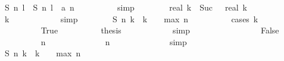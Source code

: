 \begin{isabellebody}
\ {\isachardoublequoteopen}{\isacharquery}S\ n\ l\ {\isacharequal}\ {\isacharquery}S\ {\isacharparenleft}n{\isacharminus}{}{\isacharparenright}\ {\isacharparenleft}l{\isacharminus}{}{\isacharparenright}\ {\isacharplus}\ a\ {\isacharparenleft}n{\isacharminus}{}{\isacharparenright}{\isachardoublequoteclose}\isanewline
\ \ \ \ \ \ \ \ \isamarkupfalse%
\ simp\isanewline
\isanewline
\ \ \ \ \ \ \isamarkupfalse%
\ {\isachardoublequoteopen}real\ {\isacharparenleft}k\ {\isacharminus}\ Suc\ {}{\isacharparenright}\ {\isacharequal}\ real\ k\ {\isacharminus}\ {}{\isachardoublequoteclose}\isanewline
\ \ \ \ \ \ \ \ \isamarkupfalse%
\ {\isacharbackquoteopen}k\ {\isasymge}\ {}{\isacharbackquoteclose}\isanewline
\ \ \ \ \ \ \ \ \isamarkupfalse%
\ simp\isanewline
\isanewline
\ \ \ \ \ \ \isamarkupfalse%
\ {\isachardoublequoteopen}{\isacharquery}S\ {\isacharparenleft}n{\isacharminus}{}{\isacharparenright}\ {\isacharparenleft}k{\isacharminus}{}{\isacharparenright}\ {\isasymle}\ {\isacharparenleft}k\ {\isacharminus}\ {}{\isacharparenright}\ {\isacharasterisk}\ {\isacharquery}max\ {\isacharparenleft}n\ {\isacharminus}\ {}{\isacharparenright}{\isachardoublequoteclose}\isanewline
\ \ \ \ \ \ \isamarkupfalse%
\ {\isacharparenleft}cases\ {\isachardoublequoteopen}k\ {\isacharequal}\ {}{\isachardoublequoteclose}{\isacharparenright}\isanewline
\ \ \ \ \ \ \ \ \isamarkupfalse%
\ True\isanewline
\ \ \ \ \ \ \ \ \isamarkupfalse%
\ {\isacharquery}thesis\isanewline
\ \ \ \ \ \ \ \ \ \ \isamarkupfalse%
\ simp\isanewline
\ \ \ \ \ \ \isamarkupfalse%
\isanewline
\ \ \ \ \ \ \ \ \isamarkupfalse%
\ False\isanewline
\ \ \ \ \ \ \ \ \isamarkupfalse%
\ {\isachardoublequoteopen}n{\isacharminus}{}\ {\isasymge}\ {}{\isachardoublequoteclose}\isanewline
\ \ \ \ \ \ \ \ \ \ \isamarkupfalse%
\ {\isacharbackquoteopen}n\ {\isachargreater}\ {}{\isacharbackquoteclose}\isanewline
\ \ \ \ \ \ \ \ \ \ \isamarkupfalse%
\ simp\isanewline
\ \ \ \ \ \ \ \ \isamarkupfalse%
\ {\isachardoublequoteopen}{\isacharquery}S\ {\isacharparenleft}n{\isacharminus}{}{\isacharparenright}\ {\isacharparenleft}k{\isacharminus}{}{\isacharparenright}\ {\isacharslash}\ {\isacharparenleft}k\ {\isacharminus}\ {}{\isacharparenright}\ {\isasymle}\ {\isacharquery}max\ {\isacharparenleft}n\ {\isacharminus}\ {}{\isacharparenright}{\isachardoublequoteclose}\isanewline

\end{isabellebody}
